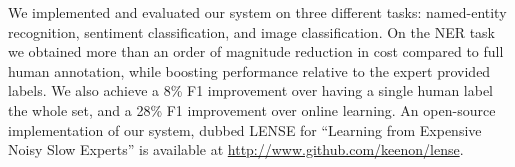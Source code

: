 We implemented and evaluated our system on three different tasks: named-entity
recognition, sentiment classification, and image classification.
On the NER task we obtained more than an order of magnitude reduction in cost compared to full human annotation, while boosting performance relative to the expert provided labels. We also achieve a 8\% F1 improvement over having a single human label the whole set, and a 28\% F1 improvement over online learning.
An open-source implementation of our system, dubbed LENSE for ``Learning from Expensive Noisy Slow Experts'' is available at
\href{http://www.github.com/keenon/lense}{http://www.github.com/keenon/lense}.
